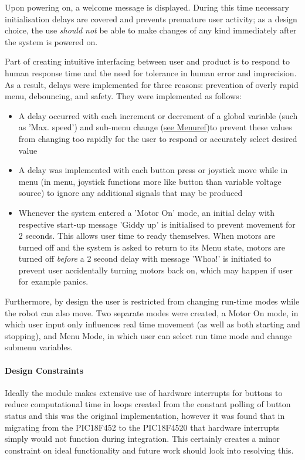 \documentclass{article}
\begin{document}
	Upon powering on, a welcome message is displayed. During this time necessary initialisation delays are covered and prevents premature user activity; as a design choice, the use \textit{should not} be able to make changes of any kind immediately after the system is powered on.
	
	Part of creating intuitive interfacing between user and product is to respond to human response time and the need for tolerance in human error and imprecision. As a result, delays were implemented for three reasons: prevention of overly rapid menu, debouncing, and safety. They were implemented as follows:
	\begin{itemize}
		\item A delay occurred with each increment or decrement of a global variable (such as 'Max. speed') and sub-menu change (\underline{see Menu\textunderscore ref})to prevent these values from changing too rapidly for the user to respond or accurately select desired value
		\item A delay was implemented with each button press or joystick move while in menu (in menu, joystick functions more like button than variable voltage source) to ignore any additional signals that may be produced
		\item Whenever the system entered a 'Motor On' mode, an initial delay with respective start-up message 'Giddy up' is initialised to prevent movement for 2 seconds. This allows user time to ready themselves. When motors are turned off and the system is asked to return to its Menu state, motors are turned off \textit{before} a 2 second delay with message 'Whoa!' is initiated to prevent user accidentally turning motors back on, which may happen if user for example panics. 
	\end{itemize}
	Furthermore, by design the user is restricted from changing run-time modes while the robot can also move. Two separate modes were created, a Motor On mode, in which user input only influences real time movement (as well as both starting and stopping), and Menu Mode, in which user can select run time mode and change submenu variables.
	

	\paragraph{Design Constraints}
	Ideally the module makes extensive use of hardware interrupts for buttons to reduce computational time in loops created from the constant polling of button status and this was the original implementation, however it was found that in migrating from the PIC18F452 to the PIC18F4520 that hardware interrupts simply would not function during integration. This certainly creates a minor constraint on ideal functionality and future work should look into resolving this.
	
\end{document}

